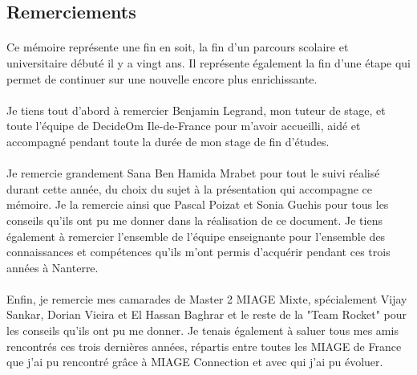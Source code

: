 \begin{center}
\subsection*{Remerciements}
\end{center}


\paragraph{}Ce mémoire représente une fin en soit, la fin d'un parcours scolaire et universitaire débuté il y a vingt ans. Il représente également la fin d'une étape qui permet de continuer sur une nouvelle encore plus enrichissante.

\paragraph{}Je tiens tout d’abord à remercier Benjamin Legrand, mon tuteur de stage, et toute l'équipe de DecideOm Ile-de-France pour m’avoir accueilli, aidé et accompagné pendant toute la durée de mon stage de fin d'études.

\paragraph{}Je remercie grandement Sana Ben Hamida Mrabet pour tout le suivi réalisé durant cette année, du choix du sujet à la présentation qui accompagne ce mémoire. Je la remercie ainsi que Pascal Poizat et Sonia Guehis pour tous les conseils qu'ils ont pu me donner dans la réalisation de ce document. Je tiens également à remercier l'ensemble de l'équipe enseignante pour l'ensemble des connaissances et compétences qu'ils m'ont permis d'acquérir pendant ces trois années à Nanterre.

\paragraph{}Enfin, je remercie mes camarades de Master 2 MIAGE Mixte, spécialement Vijay Sankar, Dorian Vieira et El Hassan Baghrar et le reste de la "Team Rocket" pour les conseils qu'ils ont pu me donner. Je tenais également à saluer tous mes amis rencontrés ces trois dernières années, répartis entre toutes les MIAGE de France que j'ai pu rencontré grâce à MIAGE Connection et avec qui j'ai pu évoluer.